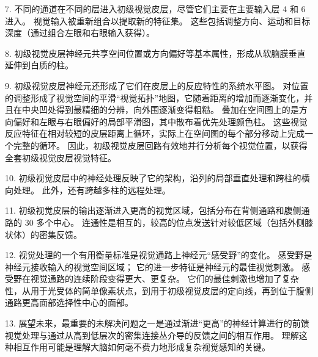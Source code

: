 7. 不同的通道在不同的层进入初级视觉皮层，尽管它们主要在主要输入层 4 和 6 进入。
视觉输入被重新组合以提取新的特征集。
这些包括调整方向、运动和目标深度（通过组合左眼和右眼输入获得）。
 

8. 初级视觉皮层神经元共享空间位置或方向偏好等基本属性，形成从软脑膜垂直延伸到白质的柱。
 


9. 初级视觉皮层神经元还形成了它们在皮层上的反应特性的系统水平图。
对位置的调整形成了视觉空间的平滑“视觉拓扑”地图，它随着距离的增加而逐渐变化，并且在中央凹处得到最精细的分辨，向外围逐渐变得粗糙。
叠加在空间图上的是方向偏好和左眼与右眼偏好的局部平滑图，其中散布着优先处理颜色柱。
这些视觉反应特征在相对较短的皮层距离上循环，实际上在空间图的每个部分移动上完成一个完整的循环。
因此，初级视觉皮层回路有效地并行分析每个视觉位置，以获得全套初级视觉皮层视觉特征。 


10. 初级视觉皮层中的神经处理反映了它的架构，沿列的局部垂直处理和跨柱的横向处理。
此外，还有跨越多柱的远程处理。


11. 初级视觉皮层的输出逐渐进入更高的视觉区域，包括分布在背侧通路和腹侧通路的 30 多个中心。
连通性是相互的，较高的位点发送针对较低区域（包括外侧膝状体）的密集反馈。 


12. 视觉处理的一个有用衡量标准是视觉通路上神经元“感受野”的变化。
感受野是神经元接收输入的视觉空间区域；
它的进一步特征是神经元的最佳视觉刺激。
感受野在视觉通路的连续阶段变得更大、更复杂。
它们的最佳刺激也增加了复杂性，从用于光受体的简单像素状点，到用于初级视觉皮层的定向线，再到位于腹侧通路更高面部选择性中心的面部。


13. 展望未来，最重要的未解决问题之一是通过渐进“更高”的神经计算进行的前馈视觉处理与通过从高到低层次的密集连接丛介导的反馈之间的相互作用。
理解这种相互作用可能是理解大脑如何毫不费力地形成复杂视觉感知的关键。


